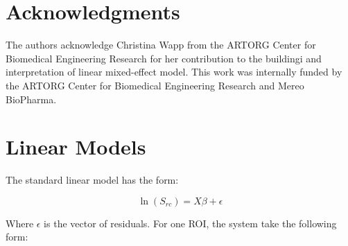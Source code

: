 \documentclass[a4paper,fleqn]{DC_ArtStyle}
\begin{document}
\section*{Acknowledgments}
The authors acknowledge Christina Wapp from the ARTORG Center for Biomedical Engineering Research for her contribution to the buildingi and interpretation of linear mixed-effect model. This work was internally funded by the ARTORG Center for Biomedical Engineering Research and Mereo BioPharma.

\appendix
\section{Linear Models}\label{A1}

The standard linear model has the form:

\begin{equation}
	\ln(S_{rc}) = X \beta + \epsilon
\end{equation}

Where $\epsilon$ is the vector of residuals. For one ROI, the system take the following form:
\end{document}
